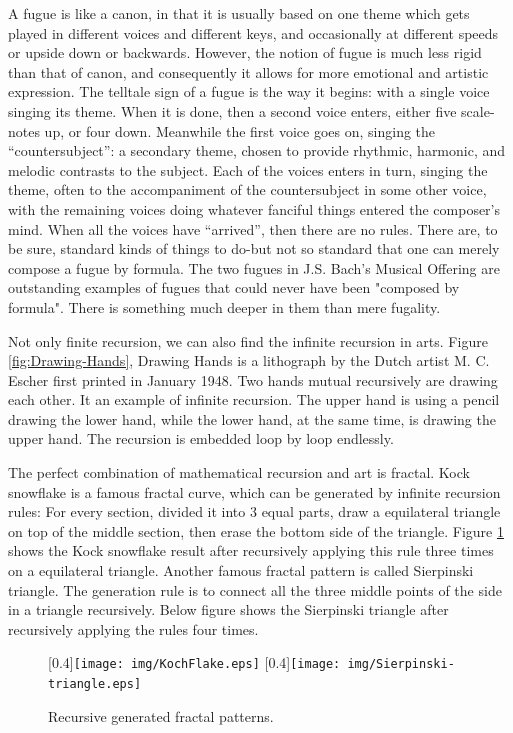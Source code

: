 \documentclass{article}
\begin{document}
A fugue is like a canon, in that it is usually based on one theme which gets played in different voices and different keys, and occasionally at different speeds or upside down or backwards. However, the notion of fugue is much less rigid than that of canon, and consequently it allows for more emotional and artistic expression. The telltale sign of a fugue is the way it begins: with a single voice singing its theme. When it is done, then a second voice enters, either five scale-notes up, or four down. Meanwhile the first voice goes on, singing the ``countersubject'': a secondary theme, chosen to provide rhythmic, harmonic, and melodic contrasts to the subject. Each of the voices enters in turn, singing the theme, often to the accompaniment of the countersubject in some other voice, with the remaining voices doing whatever fanciful things entered the composer's mind. When all the voices have ``arrived'', then there are no rules. There are, to be sure, standard kinds of things to do-but not so standard that one can merely compose a fugue by formula. The two fugues in J.S. Bach's Musical Offering are outstanding examples of fugues that could never have been "composed by formula". There is something much deeper in them than mere fugality\cite{GEB}.

Not only finite recursion, we can also find the infinite recursion in arts. Figure \ref{fig:Drawing-Hands}, Drawing Hands is a lithograph by the Dutch artist M. C. Escher first printed in January 1948. Two hands mutual recursively are drawing each other. It an example of infinite recursion. The upper hand is using a pencil drawing the lower hand, while the lower hand, at the same time, is drawing the upper hand. The recursion is embedded loop by loop endlessly.

The perfect combination of mathematical recursion and art is fractal. Kock snowflake is a famous fractal curve, which can be generated by infinite recursion rules: For every section, divided it into 3 equal parts, draw a equilateral triangle on top of the middle section, then erase the bottom side of the triangle. Figure \ref{fig:fractal} shows the Kock snowflake result after recursively applying this rule three times on a equilateral triangle. Another famous fractal pattern is called Sierpinski triangle. The generation rule is to connect all the three middle points of the side in a triangle recursively. Below figure shows the Sierpinski triangle after recursively applying the rules four times.

\begin{figure}[htbp]
 \centering
 [0.4\linewidth]{\texttt{[image: img/KochFlake.eps]}}
 [0.4\linewidth]{\texttt{[image: img/Sierpinski-triangle.eps]}}
 \caption{Recursive generated fractal patterns.}
 \label{fig:fractal}
\end{figure}
\end{document}
